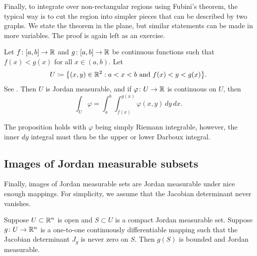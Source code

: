 Finally, to integrate over non-rectangular regions using Fubini's theorem,
the typical way is to cut the region into simpler pieces that can be
described by two graphs.  We state the theorem in the plane, but similar
statements can be made in more variables.  The proof is again left as an
exercise.

\begin{prop} \label{prop:intovertypeIset}
Let $f \colon [a,b] \to {\mathbb{R}}$ and
$g \colon [a,b] \to {\mathbb{R}}$ be continuous functions such that
$f(x) < g(x)$ for all $x \in (a,b)$.  Let
\begin{equation*}
U \coloneqq \bigl\{ (x,y) \in {\mathbb{R}}^2 : a < x < b \text{ and } f(x) < y < g(x) \bigr\} .
\end{equation*}
See .
Then $U$ is Jordan measurable, and if 
$\varphi \colon U \to {\mathbb{R}}$ is continuous on $U$, then
\begin{equation*}
\int_U \varphi =
\int_a^b \int_{f(x)}^{g(x)} \varphi(x,y) \, dy \, dx .
\end{equation*}
\end{prop}

The proposition holds with
$\varphi$ being simply Riemann integrable, however,
the inner $dy$ integral must then be the upper or lower Darboux integral.

\begin{myfigureht}
\caption{Region between two graphs.\label{fig:typeIdomain}}
\end{myfigureht}

\subsection{Images of Jordan measurable subsets}

Finally, images of Jordan measurable sets are Jordan measurable under
nice enough mappings.  For simplicity, we assume that the Jacobian
determinant never vanishes.

\begin{prop} \label{prop:imagejordanmeas}
Suppose $U \subset {\mathbb{R}}^n$ is open and
$S \subset U$ is a compact Jordan measurable set.
Suppose
$g \colon U \to {\mathbb{R}}^n$ is a one-to-one
continuously differentiable mapping such that
the Jacobian determinant $J_g$ is never zero on $S$.
Then $g(S)$ is bounded and Jordan measurable.
\end{prop}

